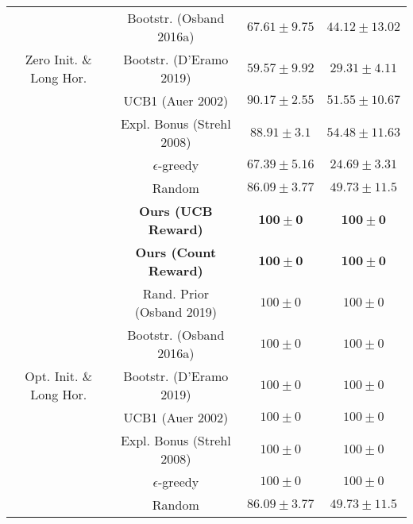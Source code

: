 \documentclass{article}
\begin{document}
\begin{table}[h]
\begin{tabular}{ c | c | c c }
 & Bootstr. (Osband 2016a) & $67.61 \pm 9.75$ & $44.12 \pm 13.02$ \\
 Zero Init. \& Long Hor. & Bootstr. (D'Eramo 2019) & $59.57 \pm 9.92$ & $29.31 \pm 4.11$ \\
 & UCB1 (Auer 2002) & $90.17 \pm 2.55$ & $51.55 \pm 10.67$ \\
 & Expl. Bonus (Strehl 2008) & $88.91 \pm 3.1$ & $54.48 \pm 11.63$ \\
 & $\epsilon$-greedy & $67.39 \pm 5.16$ & $24.69 \pm 3.31$ \\
 & Random & $86.09 \pm 3.77$ & $49.73 \pm 11.5$ \\
 \hline
 & \textbf{Ours (UCB Reward)} & $\mathbf{100 \pm 0}$ & $\mathbf{100 \pm 0}$ \\
 & \textbf{Ours (Count Reward)} & $\mathbf{100 \pm 0}$ & $\mathbf{100 \pm 0}$ \\
 & Rand. Prior (Osband 2019) & $100 \pm 0$ & $100 \pm 0$ \\
 & Bootstr. (Osband 2016a) & $100 \pm 0$ & $100 \pm 0$ \\
 Opt. Init. \& Long Hor. & Bootstr. (D'Eramo 2019) & $100 \pm 0$ & $100 \pm 0$ \\
 & UCB1 (Auer 2002) & $100 \pm 0$ & $100 \pm 0$ \\
 & Expl. Bonus (Strehl 2008) & $100 \pm 0$ & $100 \pm 0$ \\
 & $\epsilon$-greedy & $100 \pm 0$ & $100 \pm 0$ \\
 & Random & $86.09 \pm 3.77$ & $49.73 \pm 11.5$ \\
\end{tabular}
\end{table}
\end{document}
